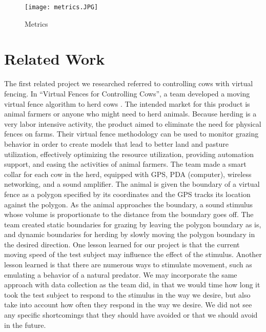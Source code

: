\documentclass{article}
\begin{document}
\begin{figure}[ht!]
\centering
\texttt{[image: metrics.JPG]}
\caption{Metrics}
\label{fig:metrics}
\end{figure}

\section{Related Work}

 The first related project we researched referred to controlling cows with virtual fencing. In ``Virtual Fences for Controlling Cows'', a team developed a moving virtual fence algorithm to herd cows \cite{butler2004virtual}. The intended market for this product is animal farmers or anyone who might need to herd animals. Because herding is a very labor intensive activity, the product aimed to eliminate the need for physical fences on farms. Their virtual fence methodology can be used to monitor grazing behavior in order to create models that lead to better land and pasture utilization, effectively optimizing the resource utilization, providing automation support, and easing the activities of animal farmers. The team made a smart collar for each cow in the herd, equipped with GPS, PDA (computer), wireless networking, and a sound amplifier. The animal is given the boundary of a virtual fence as a polygon specified by its coordinates and the GPS tracks its location against the polygon. As the animal approaches the boundary, a sound stimulus whose volume is proportionate to the distance from the boundary goes off. The team created static boundaries for grazing by leaving the polygon boundary as is, and dynamic boundaries for herding by slowly moving the polygon boundary in the desired direction. One lesson learned for our project is that the current moving speed of the test subject may influence the effect of the stimulus. Another lesson learned is that there are numerous ways to stimulate movement, such as emulating a behavior of a natural predator. We may incorporate the same approach with data collection as the team did, in that we would time how long it took the test subject to respond to the stimulus in the way we desire, but also take into account how often they respond in the way we desire. We did not see any specific shortcomings that they should have avoided or that we should avoid in the future. 
\end{document}
